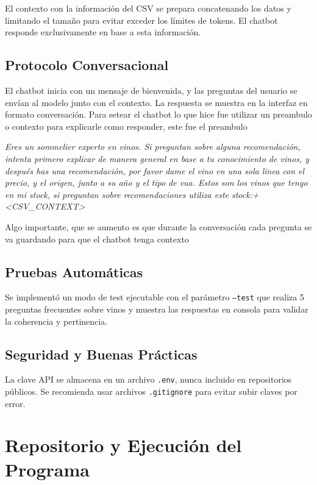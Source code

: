 \documentclass[conference]{IEEEtran}
\begin{document}
El contexto con la información del CSV se prepara concatenando los datos y
limitando el tamaño para evitar exceder los límites de tokens. El chatbot
responde exclusivamente en base a esta información.


\subsection{Protocolo Conversacional}

El chatbot inicia con un mensaje de bienvenida, y las preguntas del usuario se
envían al modelo junto con el contexto. La respuesta se muestra en la interfaz
en formato conversación. Para setear el chatbot lo que hice fue utilizar
un preambulo o contexto para explicarle como responder, este fue el preambulo

\textit{
Eres un sommelier experto en vinos. Si preguntan sobre alguna recomendación,
intenta primero explicar de manera general en base a tu conocimiento de vinos,
y después has una recomendación, por favor dame el vino en una sola linea con
el precio, y el origen, junto a su año y el tipo de vua. Estos son los vinos
que tengo en mi stock, si preguntan sobre recomendaciones utiliza este
stock:+ <CSV\_CONTEXT>}

Algo importante, que se aumento es que durante la conversación cada
pregunta se va guardando para que el chatbot tenga contexto

\subsection{Pruebas Automáticas}

Se implementó un modo de test ejecutable con el parámetro \texttt{--test} que
realiza 5 preguntas frecuentes sobre vinos y muestra las respuestas en consola
para validar la coherencia y pertinencia.

\subsection{Seguridad y Buenas Prácticas}

La clave API se almacena en un archivo \texttt{.env}, nunca incluido en
repositorios públicos. Se recomienda usar archivos \texttt{.gitignore} para
evitar subir claves por error.

\section{Repositorio y Ejecución del Programa}
\end{document}
